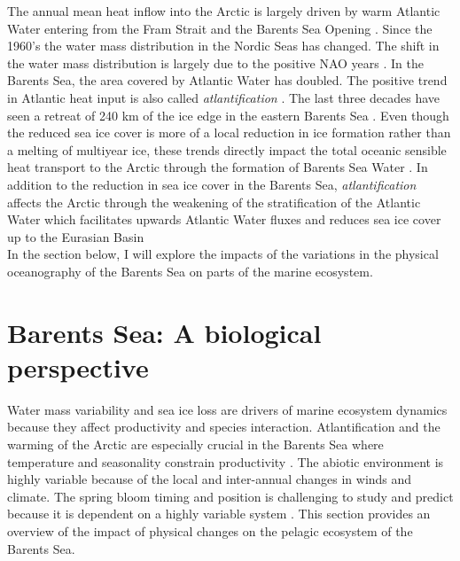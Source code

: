 \documentclass[a4paper, 12pt, Ariel]{article}
\begin{document}
The annual mean heat inflow into the Arctic is largely driven by warm Atlantic Water entering from the Fram Strait and the Barents Sea Opening \cite{Serreze2007}. Since the 1960's the water mass distribution in the Nordic Seas has changed. The shift in the water mass distribution is largely due to the positive NAO years \cite{Skagseth2008}. In the Barents Sea, the area covered by Atlantic Water has doubled. The positive trend in Atlantic heat input is also called \textit{atlantification} \cite{Aarthun2012}. The last three decades have seen a retreat of 240 km of the ice edge in the eastern Barents Sea \cite{Aarthun2012}. Even though the reduced sea ice cover is more of a local reduction in ice formation rather than a melting of multiyear ice, these trends directly impact the total oceanic sensible heat transport to the Arctic through the formation of Barents Sea Water \cite{Aarthun2012}. In addition to the reduction in sea ice cover in the Barents Sea, \textit{atlantification} affects the Arctic through the weakening of the stratification of the Atlantic Water which facilitates upwards Atlantic Water fluxes and reduces sea ice cover up to the Eurasian Basin \cite{Polyakov2017}\\

In the section below, I will explore the impacts of the variations in the physical oceanography of the Barents Sea on parts of the marine ecosystem.


\section{Barents Sea: A biological perspective}
Water mass variability and sea ice loss are drivers of marine ecosystem dynamics because they affect productivity and species interaction. Atlantification and the warming of the Arctic are especially crucial in the Barents Sea where temperature and seasonality constrain productivity \cite{Post2013}. The abiotic environment is highly variable because of the local and inter-annual changes in winds and climate. The spring bloom timing and position is challenging to study and predict because it is dependent on a highly variable system \cite{Hansen1990}. This section provides an overview of the impact of physical changes on the pelagic ecosystem of the Barents Sea.\\
\end{document}
